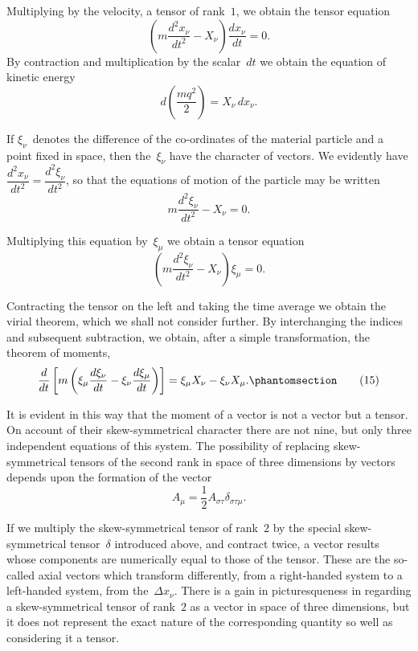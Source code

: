 \documentclass[12pt]{book}[2005/09/16]
\newcommand{\Change}[2]{#2}
\newcommand{\Add}[1]{\Change{}{#1}}
\newcommand{\PageSep}[1]{\ignorespaces}
\newcommand{\Tag}[1]{%
  \phantomsection
  \label{eqn:#1}
  \tag*{#1}
}
\begin{document}
Multiplying by the velocity, a tensor of rank~$1$, we
obtain the tensor equation
\[
\left(m\frac{d^{2} x_{\nu}}{dt^{2}} - X_{\nu}\right) \frac{dx_{\nu}}{dt} = 0.
\]
By contraction and multiplication by the scalar~$dt$ we
obtain the equation of kinetic energy
\[
d\left(\frac{mq^{2}}{2}\right) = X_{\nu}\, dx_{\nu}.
\]

If $\xi_{\nu}$~denotes the difference of the co-ordinates of
the material particle and a point fixed in space, then
the~$\xi_{\nu}$ have the character of vectors. We evidently
have $\dfrac{d^{2} x_{\nu}}{dt^{2}} = \dfrac{d^{2} \xi_{\nu}}{dt^{2}}$, so that the equations of motion of the
particle may be written
\[
m\frac{d^{2} \xi_{\nu}}{dt^{2}} - X_{\nu} = 0.
\]

Multiplying this equation by~$\xi_{\mu}$ we obtain a tensor
equation
\[
\left(m\frac{d^{2} \xi_{\nu}}{dt^{2}} - X_{\nu}\right) \xi_{\mu} = 0.
\]

Contracting the tensor on the left and taking the time
average we obtain the virial theorem, which we shall
not consider further. By interchanging the indices and
subsequent subtraction, we obtain, after a simple transformation,
the theorem of moments,
\[
\frac{d}{dt} \left[
  m \left(\xi_{\mu} \frac{d\xi_{\nu}}{dt} - \xi_{\nu} \frac{d\xi_{\mu}}{dt}\right)
\right] = \xi_{\mu} X_{\nu} - \xi_{\nu} X_{\mu}\Add{.}
\Tag{(15)}
\]

It is evident in this way that the moment of a vector
\PageSep{20}
is not a vector but a tensor. On account of their skew-symmetrical
character there are not nine, but only three
independent equations of this system. The possibility of
replacing skew-symmetrical tensors of the second rank in
space of three dimensions by vectors depends upon the
formation of the vector
\[
A_{\mu} = \frac{1}{2} A_{\sigma\tau} \delta_{\sigma\tau\mu}.
\]

If we multiply the skew-symmetrical tensor of rank~$2$
by the special skew-symmetrical tensor~$\delta$ introduced
above, and contract twice, a vector results whose components
are numerically equal to those of the tensor. These
are the so-called axial vectors which transform differently,
from a right-handed system to a left-handed system,
from the~$\Delta x_{\nu}$. There is a gain in picturesqueness in
regarding a skew-symmetrical tensor of rank~$2$ as a vector
in space of three dimensions, but it does not represent
the exact nature of the corresponding quantity so well as
considering it a tensor.
\end{document}
